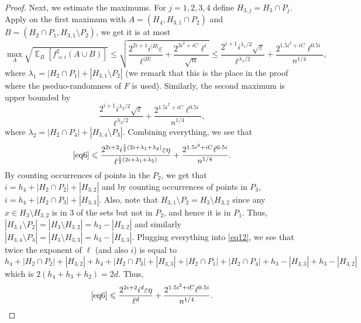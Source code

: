 \documentclass{toc}
\newcommand\card[1]{\left| {#1} \right|}
\newcommand\Expect[2]{{\mathop{\mathbb{E}}_{#1}\left[ {#2} \right]}}
\newcommand\half{\frac{1}{2}}
\newcommand\eps{\varepsilon}
\renewcommand\leq{\leqslant}
\newcommand\approxlvlfn[2]{{#1}_{\approx{#2}}}
\begin{document}
\begin{proof}
Next, we estimate the maximums. For $j=1,2,3,4$ define $H_{3,j} = H_3\cap P_j$.
Apply  on the first maximum with $A = (H_4, H_{3,1}\cap P_2)$
and $B = (H_2\cap P_1, H_{3,1}\setminus P_2)$, we get it is at most%
\[
\max_{A}
\sqrt{\Expect{B}{\approxlvlfn{f}{i}^2(A\cup B)}}
\leq \sqrt{\frac{2^{2i+1} i^{\card{B}} \eps}{\ell^{\card{B}}} + \frac{2^{3i^2+iC} \ell^{i}}{\sqrt{n}}}
\leq \frac{2^{i+1} i^{\lambda_1/2}\sqrt{\eps}}{\ell^{\lambda_1/2}}
     +\frac{2^{1.5i^2+iC} \ell^{0.5i}}{n^{1/4}},
\]
where $\lambda_1 = \card{H_2\cap P_1}+\card{H_{3,1}\setminus P_2}$ (we remark that this is the place in the proof
%
where  %
the pseduo-randomness of
$F$ is used). Similarly, the second maximum is upper bounded by
\[
\frac{2^{i+1} i^{\lambda_2/2}\sqrt{\eps}}{\ell^{\lambda_2/2}}%
     +\frac{2^{1.5i^2+iC} \ell^{0.5i}}{n^{1/4}},
\]
where $\lambda_2 = \card{H_2\cap P_4}+\card{H_{3,4}\setminus P_3}$.
Combining everything, we see that
\begin{equation}\label{eq12}
\eqref{eq6}\leq
\frac{2^{2i+2} i^{\half(2i+\lambda_1+\lambda_2) } \eps\eta}{\ell^{\half(2i+\lambda_1+\lambda_2)}}
+\frac{2^{1.5i^2+iC} \ell^{0.5i}}{n^{1/4}}.
\end{equation}
By counting occurrences of points in the $P_2$, we get that $i = h_4 + \card{H_2\cap P_2} + \card{H_{3,2}}$
and by counting occurrences of points in $P_3$, $i = h_4 + \card{H_2\cap P_3} + \card{H_{3,3}}$. Also,
note that $H_{3,1}\setminus P_2 = H_3\setminus H_{3,2}$ since any $x\in H_3\setminus H_{3,2}$ is in $3$ of the sets
but not in $P_2$, and hence it is in $P_1$. Thus,
$\card{H_{3,1}\setminus P_2} = \card{H_3\setminus H_{3,2}} = h_3 - \card{H_{3,2}}$
and similarly $\card{H_{3,4}\setminus P_3} = \card{H_3\setminus H_{3,3}} = h_3 - \card{H_{3,3}}$.
Plugging everything into \eqref{eq12}, we see that twice the exponent of $\ell$ (and also $i$) is equal to
\[
h_4 + \card{H_2\cap P_2} + \card{H_{3,2}}
+h_4 + \card{H_2\cap P_3} + \card{H_{3,3}}
+\card{H_2\cap P_1}+\card{H_2\cap P_4}+h_3 - \card{H_{3,3}}+h_3 - \card{H_{3,2}}
\]
which is $2(h_4+h_3+h_2) = 2d$.
Thus,
\[
\eqref{eq6}\leq
\frac{2^{2i+2} i^{d} \eps\eta}{\ell^{d}}
+\frac{2^{1.5i^2+iC} \ell^{0.5i}}{n^{1/4}}.
\qedhere       %
\]
\end{proof}
\end{document}
